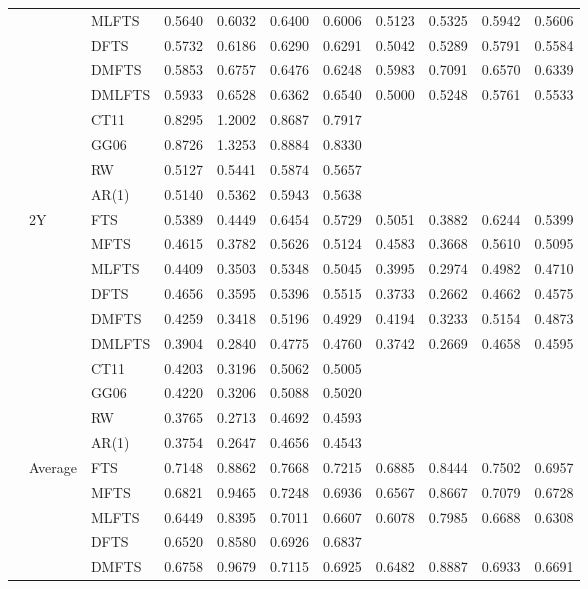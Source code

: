 \documentclass[12pt,a4paper]{article}
\def\textBF#1{\sbox\CBox{#1}\resizebox{\wd\CBox}{\ht\CBox}{\textbf{#1}}}
\begin{document}
\begin{center}
\begin{small}
\begin{longtable}{@{}lllcccccccc@{}}
   & & MLFTS & 0.5640 & 0.6032 & 0.6400 & 0.6006 & 0.5123 & 0.5325 & 0.5942 & 0.5606 \\
   & & DFTS & 0.5732 & 0.6186 & 0.6290 & 0.6291 & 0.5042 & 0.5289 & 0.5791 & 0.5584 \\ 
   & & DMFTS & 0.5853 & 0.6757 & 0.6476 & 0.6248 & 0.5983 & 0.7091 & 0.6570 & 0.6339 \\ 
   & & DMLFTS & 0.5933 & 0.6528 & 0.6362 & 0.6540 & 0.5000 & 0.5248 & 0.5761 & 0.5533 \\
   & & CT11 & 0.8295 & 1.2002 & 0.8687 & 0.7917 \\
   & & GG06 & 0.8726 & 1.3253 & 0.8884 & 0.8330 \\
   & & RW & 0.5127 & 0.5441 & 0.5874 & 0.5657 \\
   & & AR(1) & 0.5140 & 0.5362 & 0.5943 & 0.5638 \\
   \cmidrule{2-11}
   & 2Y  & FTS & 0.5389 & 0.4449 & 0.6454 & 0.5729 & 0.5051 & 0.3882 & 0.6244 & 0.5399 \\ 
  & & MFTS & 0.4615 & 0.3782 & 0.5626 & 0.5124 & 0.4583 & 0.3668 & 0.5610 & 0.5095 \\ 
& & MLFTS & 0.4409 & 0.3503 & 0.5348 & 0.5045 & 0.3995 & 0.2974 & 0.4982 & 0.4710 \\
   & & DFTS & 0.4656 & 0.3595 & 0.5396 & 0.5515 & 0.3733 & 0.2662 & 0.4662 & 0.4575 \\ 
 & & DMFTS & 0.4259 & 0.3418 & 0.5196 & 0.4929 & 0.4194 & 0.3233 & 0.5154 & 0.4873 \\ 
& & DMLFTS & 0.3904 & 0.2840 & 0.4775 & 0.4760 & 0.3742 & 0.2669 & 0.4658 & 0.4595\\
& & CT11 & 0.4203 & 0.3196 & 0.5062 & 0.5005 \\
& & GG06 & 0.4220 & 0.3206 & 0.5088 & 0.5020 \\
& & RW & 0.3765 & 0.2713 & 0.4692 & 0.4593 \\
& & AR(1) & 0.3754 & 0.2647 & 0.4656 & 0.4543 \\
   \cmidrule{2-11}
   & Average & FTS & 0.7148 & 0.8862 & 0.7668 & 0.7215 & 0.6885 & 0.8444 & 0.7502 & 0.6957 \\ 
  & & MFTS & 0.6821 & 0.9465 & 0.7248 & 0.6936 & 0.6567 & 0.8667 & 0.7079 & 0.6728 \\
  & & MLFTS & 0.6449 & 0.8395 & 0.7011 & 0.6607 & 0.6078 & 0.7985 & 0.6688 & 0.6308\\
  & & DFTS & 0.6520 & 0.8580 & 0.6926 & 0.6837 & \textBF{0.5926} &  \textBF{0.7838} & \textBF{0.6478} & \textBF{0.6238} \\ 
  & & DMFTS & 0.6758 & 0.9679 & 0.7115 & 0.6925 & 0.6482 & 0.8887 & 0.6933 & 0.6691 \\

\end{longtable}
\end{small}
\end{center}
\end{document}
